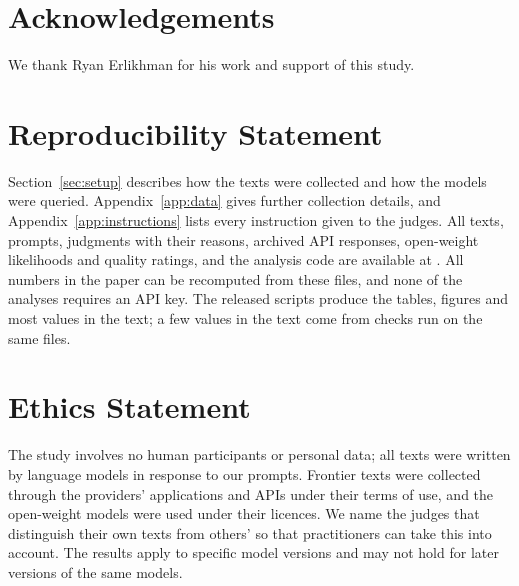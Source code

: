 \section*{Acknowledgements}
We thank Ryan Erlikhman for his work and support of this study.

\section*{Reproducibility Statement}
Section~\ref{sec:setup} describes how the texts were collected and how the
models were queried. Appendix~\ref{app:data} gives further collection details,
and Appendix~\ref{app:instructions} lists every instruction given to the judges.
All texts, prompts, judgments with their reasons, archived API responses,
open-weight likelihoods and quality ratings, and the analysis code are available
at \CodeURL{}. All numbers in the paper can be recomputed from these files,
and none of the analyses requires an API key. The released scripts produce
the tables, figures and most values in the text; a few values in the text come
from checks run on the same files.

\section*{Ethics Statement}
The study involves no human participants or personal data; all texts were
written by language models in response to our prompts. Frontier texts were
collected through the providers' applications and APIs under their terms of use,
and the open-weight models were used under their licences. We name the judges
that distinguish their own texts from others' so that practitioners can take
this into account.
The results apply to specific model versions and may not hold for later
versions of the same models.
